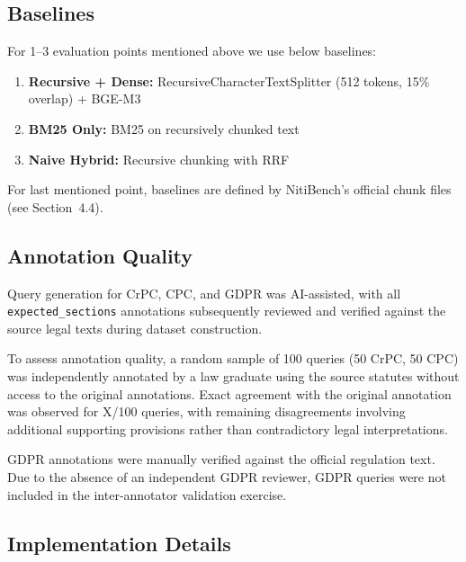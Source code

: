 \documentclass[sn-mathphys,Numbered]{sn-jnl}%
\begin{document}
\subsection{Baselines}

For 1--3 evaluation points mentioned above we use below baselines:

\begin{enumerate}
\item \textbf{Recursive + Dense:} RecursiveCharacterTextSplitter
      (512 tokens, 15\% overlap) + BGE-M3
\item \textbf{BM25 Only:} BM25 on recursively chunked text
\item \textbf{Naive Hybrid:} Recursive chunking with RRF
\end{enumerate}

For last mentioned point, baselines are defined by NitiBench's official chunk files
(see Section~4.4).

\subsection{Annotation Quality}
\label{sec:annotation_quality}

Query generation for CrPC, CPC, and GDPR was AI-assisted, with all
\texttt{expected\_sections} annotations subsequently reviewed and verified
against the source legal texts during dataset construction.

To assess annotation quality, a random sample of 100 queries (50 CrPC,
50 CPC) was independently annotated by a law graduate using the source
statutes without access to the original annotations.  Exact agreement
with the original annotation was observed for X/100 queries,
with remaining disagreements involving additional supporting provisions
rather than contradictory legal interpretations.

GDPR annotations were manually verified against the official regulation
text.  Due to the absence of an independent GDPR reviewer, GDPR queries
were not included in the inter-annotator validation exercise.

\subsection{Implementation Details}
\end{document}
